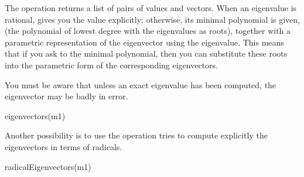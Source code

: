 {{{{{{{{{{{The operation  returns a list of pairs of values and
vectors. When an eigenvalue is rational, \Language{} gives you
the value explicitly; otherwise, its minimal polynomial is given,
(the polynomial of lowest degree with the eigenvalues as roots),
together with a parametric representation of the eigenvector using the
eigenvalue.
This means that if you ask \Language{} to 
the minimal polynomial, then you can substitute these roots
into the parametric form of the corresponding eigenvectors.

\begin{xtc}
\begin{xtccomment}
You must be aware that unless an exact eigenvalue has been computed,
the eigenvector may be badly in error.
\end{xtccomment}
\begin{spadsrc}
eigenvectors(m1) 
\end{spadsrc}
\begin{TeXOutput}
\begin{fricasmath}{4}
%
\end{fricasmath}
\end{TeXOutput}
\end{xtc}
\begin{xtc}
\begin{xtccomment}
Another possibility is to use the operation
tries to compute explicitly the eigenvectors
in terms of radicals.
\end{xtccomment}
\begin{spadsrc}
radicalEigenvectors(m1) 
\end{spadsrc}

\end{xtc}}}}}}}}}}}}
